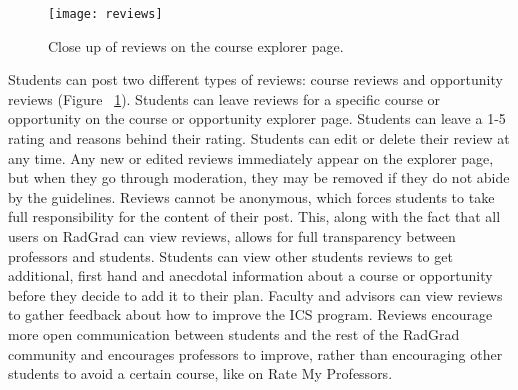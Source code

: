\begin{figure}[htbp!]
\centering
\texttt{[image: reviews]}
\caption{Close up of reviews on the course explorer page.}
\label{reviews}
\end{figure}
Students can post two different types of reviews: course reviews and opportunity reviews (Figure ~\ref{reviews}). Students can leave reviews for a specific course or opportunity on the course or opportunity explorer page. Students can leave a 1-5 rating and reasons behind their rating. Students can edit or delete their review at any time. Any new or edited reviews immediately appear on the explorer page, but when they go through moderation, they may be removed if they do not abide by the guidelines. Reviews cannot be anonymous, which forces students to take full responsibility for the content of their post. This, along with the fact that all users on RadGrad can view reviews, allows for full transparency between professors and students. Students can view other students reviews to get additional, first hand and anecdotal information about a course or opportunity before they decide to add it to their plan. Faculty and advisors can view reviews to gather feedback about how to improve the ICS program. Reviews encourage more open communication between students and the rest of the RadGrad community and encourages professors to improve, rather than encouraging other students to avoid a certain course, like on Rate My Professors. 

